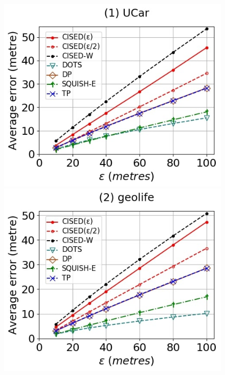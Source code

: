 \begin{figure}[tb!]
	\centering
	\includegraphics[scale=0.250]{Figures/Exp-SED-error-epsilon-service.jpg}	\hspace{0.5ex}
	\includegraphics[scale=0.250]{Figures/Exp-SED-error-epsilon-geolife.jpg}	\hspace{0.5ex}

\end{figure}
